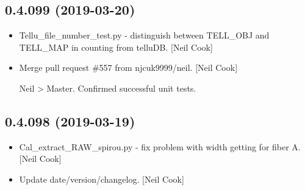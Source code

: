 \documentclass[a4paper,10pt,english]{report}
\begin{document}
\subsection{0.4.099 (2019-03-20)}
\label{\detokenize{misc/changelog:id159}}\begin{itemize}
\item {} 
Tellu\_file\_number\_test.py - distinguish between TELL\_OBJ and TELL\_MAP
in counting from telluDB. {[}Neil Cook{]}

\item {} 
Merge pull request \#557 from njcuk9999/neil. {[}Neil Cook{]}

Neil \textendash{}\textgreater{} Master. Confirmed successful unit tests.

\end{itemize}


\subsection{0.4.098 (2019-03-19)}
\label{\detokenize{misc/changelog:id160}}\begin{itemize}
\item {} 
Cal\_extract\_RAW\_spirou.py - fix problem with width getting for fiber
A. {[}Neil Cook{]}

\item {} 
Update date/version/changelog. {[}Neil Cook{]}

\end{itemize}
\end{document}

